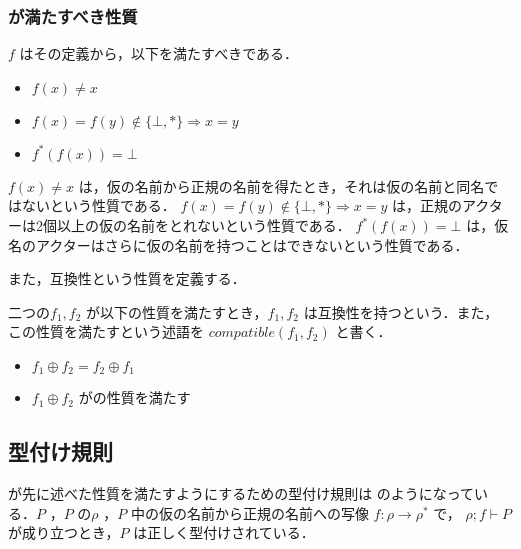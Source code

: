 \subsubsection{\tmp が満たすべき性質}

\tmp $f$ はその定義から，以下を満たすべきである．

\begin{itemize}
  \item $ f(x) \neq x $
  \item $ f(x) = f(y) \notin \{\bot,\ast\} \Rightarrow x = y $
  \item $ f^{*}(f(x)) = \bot $
\end{itemize}

$ f(x) \neq x $ は，仮の名前から正規の名前を得たとき，それは仮の名前と同名ではないという性質である．
$ f(x) = f(y) \notin \{\bot,\ast\} \Rightarrow x = y $ は，正規のアクターは2個以上の仮の名前をとれないという性質である．
$ f^{*}(f(x)) = \bot $ は，仮名のアクターはさらに仮の名前を持つことはできないという性質である．

また，互換性という性質を定義する．

\begin{dfn}
  二つの\tmp $f_1, f_2$ が以下の性質を満たすとき，$f_1,f_2$ は互換性を持つという．また，この性質を満たすという述語を $compatible(f_1,f_2)$ と書く．
  \begin{itemize}
    \item $f_1 \oplus f_2 = f_2 \oplus f_1$
    \item $f_1 \oplus f_2$ が\tmp の性質を満たす
  \end{itemize}
\end{dfn}

\subsection{型付け規則}

\label{typing_rule}

\api が先に述べた性質を満たすようにするための型付け規則は  のようになっている．\conf $ P $ ，$ P $ の\recep $ \rho $ ，$ P $ 中の仮の名前から正規の名前への写像 $f : \rho \rightarrow \rho^*$ で， $\rho ; f \vdash P$ が成り立つとき，$ P $ は正しく型付けされている．

